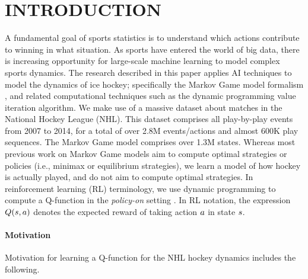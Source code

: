 \documentclass[]{article}
\begin{document}




\section{INTRODUCTION}

A fundamental goal of sports statistics is to understand which actions contribute to winning in what situation. As sports have entered the world of big data, there is increasing opportunity for large-scale machine learning to model complex sports dynamics. The research described in this paper applies AI techniques to model the dynamics of ice  hockey; specifically the Markov Game model formalism \citep{Littman1994}, and related computational techniques such as the dynamic programming value iteration algorithm. We make use of a massive dataset about matches in the National  Hockey League (NHL). This dataset comprises all play-by-play events from 2007 to 2014, for a total of over 2.8M events/actions and almost 600K play sequences. The Markov Game model comprises over 1.3M states. Whereas most previous work on Markov Game models aim to compute optimal strategies or policies \citep{Littman1994} (i.e., minimax or equilibrium strategies), we learn a model of how hockey is actually played, and do not aim to compute optimal strategies. In reinforcement learning (RL) terminology, we use dynamic programming to compute a Q-function in the {\em policy-on} setting \citep{bib:sutton}. In RL notation, the expression $Q(s,a)$ denotes the expected reward of taking action $a$ in state $s$.

\paragraph{Motivation}
Motivation for learning a Q-function for the NHL hockey dynamics includes the following.
\end{document}
